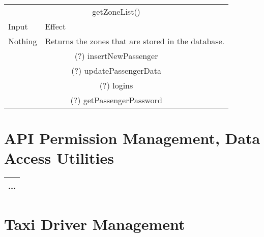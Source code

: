 \documentclass[11pt,oneside,a4paper]{report}
\begin{document}
\begin{tabular}{p{5cm}|p{6cm}}
	
	\multicolumn{2}{c}{getZoneList()}\\
	Input & Effect \\\hline
	Nothing &
	Returns the zones that are stored in the database.  \\\hline\hline
	
	
	\multicolumn{2}{c}{
	(?) insertNewPassenger}\\
	
		\multicolumn{2}{c}{
	(?) updatePassengerData}\\
		\multicolumn{2}{c}{
	(?) logins}\\
	\multicolumn{2}{c}{	(?) getPassengerPassword}\\\hline
	
\end{tabular}



\section{API Permission Management, Data Access Utilities}
\begin{tabular}{p{5cm}|p{6cm}}
	\hline
	\multicolumn{2}{c}{...}\\\hline
\end{tabular}


\section{Taxi Driver Management}
\end{document}
